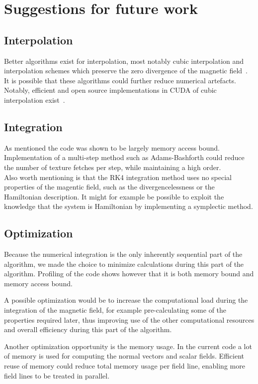 \documentclass[a4paper]{article}
\begin{document}
\section{Suggestions for future work}

\subsection{Interpolation}
Better algorithms exist for interpolation, most notably cubic interpolation and interpolation schemes which preserve the zero divergence of the magnetic field~\cite{McNally01052011}. It is possible that these algorithms could further reduce numerical artefacts. 
Notably, efficient and open source implementations in CUDA of cubic interpolation exist~\cite{Ruijters01012012}.

\subsection{Integration}
As mentioned the code was shown to be largely memory access bound. Implementation of a multi-step method such as Adams-Bashforth could reduce the number of texture fetches per step, while maintaining a high order.\\
Also worth mentioning is that the RK4 integration method uses no special properties of the magentic field, such as the divergencelessness or the Hamiltonian description. It might for example be possible to exploit the knowledge that the system is Hamiltonian by implementing a symplectic method.

\subsection{Optimization}
Because the numerical integration is the only inherently sequential part of the algorithm, we made the choice to minimize calculations during this part of the algorithm. 
Profiling of the code shows however that it is both memory bound and memory access bound. 

A possible optimization would be to increase the computational load during the integration of the magnetic field, for example pre-calculating some of the properties required later, thus improving use of the other computational resources and overall efficiency during this part of the algorithm.

Another optimization opportunity is the memory usage. In the current code a lot of memory is used for computing the normal vectors and scalar fields. Efficient reuse of memory could reduce total memory usage per field line, enabling more field lines to be treated in parallel.



\newpage


\end{document}
